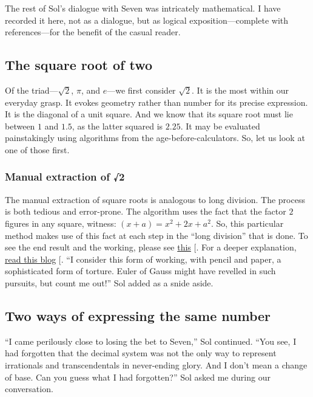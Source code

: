 \documentclass[
  a4paper,
]{article}
\begin{document}
The rest of Sol's dialogue with Seven was intricately mathematical. I
have recorded it here, not as a dialogue, but as logical
exposition---complete with references---for the benefit of the casual
reader.

\subsection{The square root of two}\label{the-square-root-of-two}

Of the triad---\(\sqrt{2}\), \(\pi\), and \(e\)---we first consider
\(\sqrt{2}\). It is the most within our everyday grasp. It evokes
geometry rather than number for its precise expression. It is the
diagonal of a unit square. And we know that its square root must lie
between \(1\) and \(1.5\), as the latter squared is \(2.25\). It may be
evaluated painstakingly using algorithms from the
age-before-calculators. So, let us look at one of those first.

\subsubsection{Manual extraction of √2}\label{manual-extraction-of-2}

The manual extraction of square roots is analogous to long division. The
process is both tedious and error-prone. The algorithm uses the fact
that the factor \(2\) figures in any square, witness:
\((x + a) = x^2 + 2x +a^2\). So, this particular method makes use of
this fact at each step in the ``long division'' that is done. To see the
end result and the working, please see
\href{https://www.cuemath.com/algebra/square-root-of-2/}{this}
{[}\citeproc{ref-cuemathsqrt}{4}{]}. For a deeper explanation,
\href{https://www.cantorsparadise.com/the-square-root-algorithm-f97ab5c29d6d}{read
this blog} {[}\citeproc{ref-ujjwalsingh2021}{5}{]}. ``I consider this
form of working, with pencil and paper, a sophisticated form of torture.
Euler of Gauss might have revelled in such pursuits, but count me out!''
Sol added as a snide aside.

\subsection{Two ways of expressing the same
number}\label{two-ways-of-expressing-the-same-number}

``I came perilously close to losing the bet to Seven,'' Sol continued.
``You see, I had forgotten that the decimal system was not the only way
to represent irrationals and transcendentals in never-ending glory. And
I don't mean a change of base. Can you guess what I had forgotten?'' Sol
asked me during our conversation.
\end{document}
